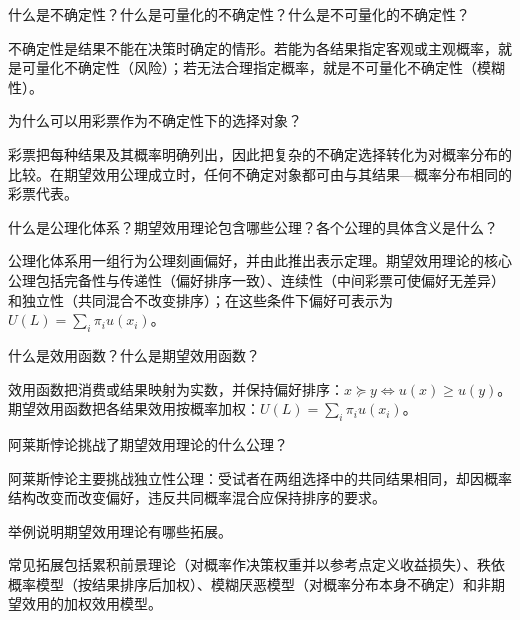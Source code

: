 
\begin{problem}
 什么是不确定性？什么是可量化的不确定性？什么是不可量化的不确定性？
\end{problem}
\begin{solution}
不确定性是结果不能在决策时确定的情形。若能为各结果指定客观或主观概率，就是可量化不确定性（风险）；若无法合理指定概率，就是不可量化不确定性（模糊性）。
\end{solution}
\begin{problem}
 为什么可以用彩票作为不确定性下的选择对象？
\end{problem}
\begin{solution}
彩票把每种结果及其概率明确列出，因此把复杂的不确定选择转化为对概率分布的比较。在期望效用公理成立时，任何不确定对象都可由与其结果—概率分布相同的彩票代表。
\end{solution}
\begin{problem}
 什么是公理化体系？期望效用理论包含哪些公理？各个公理的具体含义是什么？
\end{problem}
\begin{solution}
公理化体系用一组行为公理刻画偏好，并由此推出表示定理。期望效用理论的核心公理包括完备性与传递性（偏好排序一致）、连续性（中间彩票可使偏好无差异）和独立性（共同混合不改变排序）；在这些条件下偏好可表示为 $U(L)=\sum_i\pi_i u(x_i)$。
\end{solution}
\begin{problem}
 什么是效用函数？什么是期望效用函数？
\end{problem}
\begin{solution}
效用函数把消费或结果映射为实数，并保持偏好排序：$x\succeq y\Leftrightarrow u(x)\ge u(y)$。期望效用函数把各结果效用按概率加权：$U(L)=\sum_i\pi_i u(x_i)$。
\end{solution}
\begin{problem}
 阿莱斯悖论挑战了期望效用理论的什么公理？
\end{problem}
\begin{solution}
阿莱斯悖论主要挑战独立性公理：受试者在两组选择中的共同结果相同，却因概率结构改变而改变偏好，违反共同概率混合应保持排序的要求。
\end{solution}
\begin{problem}
 举例说明期望效用理论有哪些拓展。
\end{problem}
\begin{solution}
常见拓展包括累积前景理论（对概率作决策权重并以参考点定义收益损失）、秩依概率模型（按结果排序后加权）、模糊厌恶模型（对概率分布本身不确定）和非期望效用的加权效用模型。
\end{solution}
